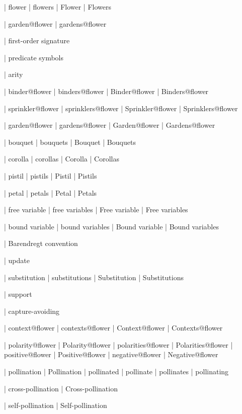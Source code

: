  | flower
 | flowers
 | Flower
 | Flowers

 | garden@flower
 | gardens@flower

 | first-order signature

 | predicate symbols

 | arity

 | binder@flower
 | binders@flower
 | Binder@flower
 | Binders@flower

 | sprinkler@flower
 | sprinklers@flower
 | Sprinkler@flower
 | Sprinklers@flower

 | garden@flower
 | gardens@flower
 | Garden@flower
 | Gardens@flower

 | bouquet
 | bouquets
 | Bouquet
 | Bouquets

 | corolla
 | corollas
 | Corolla
 | Corollas

 | pistil
 | pistils
 | Pistil
 | Pistils

 | petal
 | petals
 | Petal
 | Petals

 | free variable
 | free variables
 | Free variable
 | Free variables

 | bound variable
 | bound variables
 | Bound variable
 | Bound variables

 | Barendregt convention

 | update

 | substitution
 | substitutions
 | Substitution
 | Substitutions

 | support

 | capture-avoiding

 | context@flower
 | contexts@flower
 | Context@flower
 | Contexts@flower

 | polarity@flower
 | Polarity@flower
 | polarities@flower
 | Polarities@flower
 | positive@flower
 | Positive@flower
 | negative@flower
 | Negative@flower

 | pollination
 | Pollination
 | pollinated
 | pollinate
 | pollinates
 | pollinating

 | cross-pollination
 | Cross-pollination

 | self-pollination
 | Self-pollination

